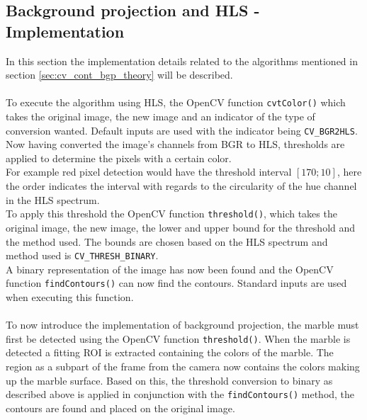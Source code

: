 \documentclass[../../../../main.tex]{subfiles}
\begin{document}
\subsection{Background projection and HLS - Implementation}
\label{sec:cv_cont_bgp_impl}


In this section the implementation details related to the algorithms mentioned in section \ref{sec:cv_cont_bgp_theory} will be described.\\
\\
To execute the algorithm using HLS, the OpenCV function \texttt{cvtColor()} which takes the original image,
the new image and an indicator of the type of conversion wanted. Default inputs are used with the indicator being \texttt{CV\_BGR2HLS}.\\
Now having converted the image's channels from BGR to HLS, thresholds are applied to determine the pixels with a certain color.\\
For example red pixel detection would have the threshold interval $[170;10]$, here the order indicates the interval with regards to the circularity of the hue channel in the HLS spectrum.\\
To apply this threshold the OpenCV function \texttt{threshold()}, which takes the original image, the new image, the lower and upper bound for the threshold and the method used. The bounds are chosen based on the HLS spectrum and method used is \texttt{CV\_THRESH\_BINARY}.\\
A binary representation of the image has now been found and the OpenCV function \texttt{findContours()} can now find the contours.
Standard inputs are used when executing this function.\\
\\
To now introduce the implementation of background projection, the marble must first be detected using the OpenCV function \texttt{threshold()}. When the marble is detected a fitting ROI is extracted containing the colors of the marble.
The region as a subpart of the frame from the camera now contains the colors making up the marble surface.
Based on this, the threshold conversion to binary as described above is applied in conjunction with the \texttt{findContours()} method, the contours are found and placed on the original image.\\
\end{document}
